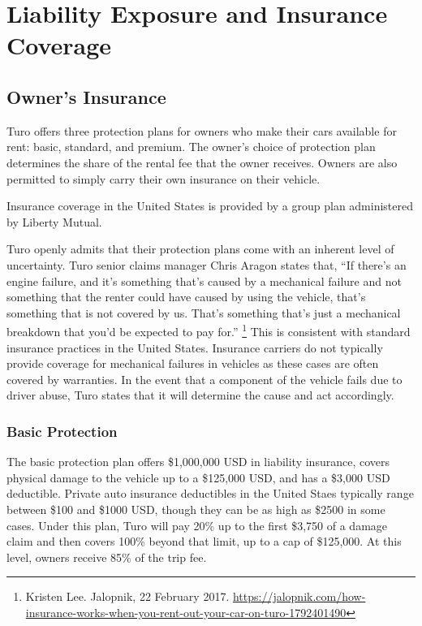 \documentclass[review,12pt]{elsarticle}
\begin{document}
\section{Liability Exposure and Insurance Coverage}
\label{S:2}
\subsection{Owner's Insurance}
Turo offers three protection plans for owners who make their cars available for rent: basic, standard, and premium. The owner's choice of protection plan determines the share of the rental fee that the owner receives. Owners are also permitted to simply carry their own insurance on their vehicle.

Insurance coverage in the United States is provided by a group plan administered by Liberty Mutual.

Turo openly admits that their protection plans come with an inherent level of uncertainty. Turo senior claims manager Chris Aragon states that, ``If there’s an engine failure, and it’s something that’s caused by a mechanical failure and not something that the renter could have caused by using the vehicle, that’s something that is not covered by us. That’s something that’s just a mechanical breakdown that you’d be expected to pay for.''
  \footnote{
  Kristen Lee. Jalopnik, 22 February 2017. \url{https://jalopnik.com/how-insurance-works-when-you-rent-out-your-car-on-turo-1792401490}
  }
This is consistent with standard insurance practices in the United States. Insurance carriers do not typically provide coverage for mechanical failures in vehicles as these cases are often covered by warranties. In the event that a component of the vehicle fails due to driver abuse, Turo states that it will determine the cause and act accordingly.

\subsubsection{Basic Protection}
The basic protection plan offers \$1,000,000 USD in liability insurance, covers physical damage to the vehicle up to a \$125,000 USD, and has a \$3,000 USD deductible. Private auto insurance deductibles in the United Staes typically range between \$100 and \$1000 USD, though they can be as high as \$2500 in some cases. Under this plan, Turo will pay 20\% up to the first \$3,750 of a damage claim and then covers 100\% beyond that limit, up to a cap of \$125,000. At this level, owners receive 85\% of the trip fee.
\end{document}
